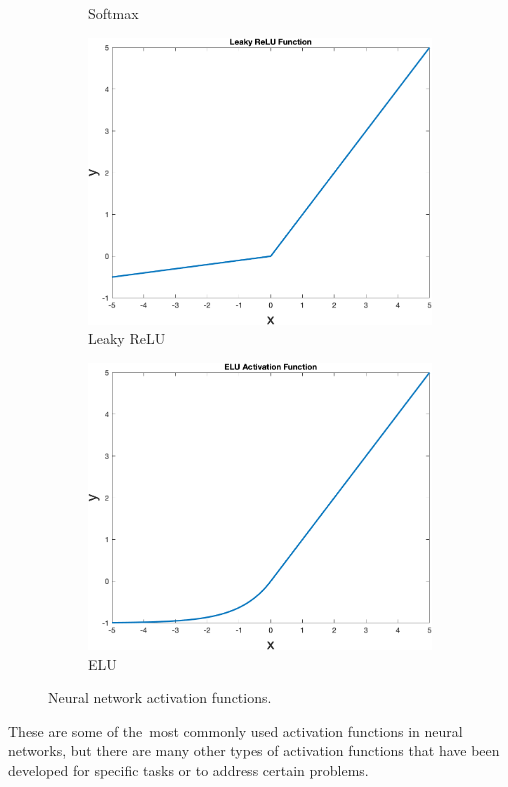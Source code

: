 \begin{figure}[!ht]
\begin{subfigure}[b]{0.3\textwidth}
            \caption{Softmax}
            \label{fig:sigmsoftmaxoid}
        \end{subfigure}
        \begin{subfigure}[b]{0.3\textwidth}
            \includegraphics[width=\textwidth]{figures/leakyrelu}
            \caption{Leaky ReLU}
            \label{fig:leakyrelu}
        \end{subfigure}
        \hspace{0.1\textwidth}
        \begin{subfigure}[b]{0.3\textwidth}
            \includegraphics[width=\textwidth]{figures/elu}
            \caption{ELU}
            \label{fig:elu}
        \end{subfigure}
        \caption{Neural network activation functions.}
        \label{fig:activationfunctions}
    \end{figure}

    \noindent These are some of the~most commonly used activation functions in neural networks,
    but there are many other types of activation functions that have been developed
    for specific tasks or to address certain problems.